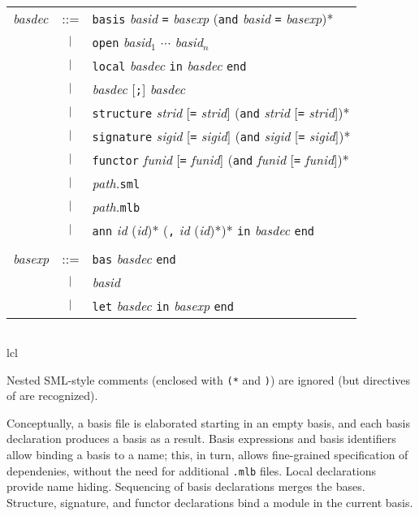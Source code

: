 \begin{latexonly}
\begin{center}
\begin{tabular}{lcl}
{\it basdec} 
& ::=    & {\tt basis} {\it basid} {\tt =} {\it basexp}
            ({\tt and} {\it basid} {\tt =} {\it basexp})* \\
& $\ |\ $ & {\tt open} {\it basid}$_1$ $\cdots$ {\it basid}$_n$ \\
& $\ |\ $ & {\tt local} {\it basdec} {\tt in} {\it basdec} {\tt end} \\
& $\ |\ $ & {\it basdec} [{\tt;}] {\it basdec} \\
& $\ |\ $ & {\tt structure} {\it strid} [{\tt =} {\it strid}] 
                ({\tt and} {\it strid} [{\tt =} {\it strid}])* \\
& $\ |\ $ & {\tt signature} {\it sigid} [{\tt =} {\it sigid}] 
                ({\tt and} {\it sigid} [{\tt =} {\it sigid}])* \\
& $\ |\ $ &   {\tt functor} {\it funid} [{\tt =} {\it funid}] 
                ({\tt and} {\it funid} [{\tt =} {\it funid}])* \\
& $\ |\ $ & {\it path.}{\tt sml} \\
& $\ |\ $ & {\it path.}{\tt mlb} \\
& $\ |\ $ & {\tt ann} {\it id} ({\it id})* ({\tt ,}  {\it id} ({\it id})*)*
           {\tt in} {\it basdec} {\tt end} \\
\\
{\it basexp}
& ::=    & {\tt bas} {\it basdec} {\tt end} \\
& $\ |\ $ & {\it basid} \\
& $\ |\ $ & {\tt let} {\it basdec} {\tt in} {\it basexp} {\tt end}
\end{tabular}
\end{center}
\end{latexonly}
\begin{htmlonly}
\begin{center}
\begin{tabular}{lcl}
\end{tabular}{lcl}
\end{center}
\end{htmlonly}

Nested SML-style comments (enclosed with {\tt (*} and {\tt *)}) are
ignored (but {\nline} directives of  are recognized).

Conceptually, a basis file is elaborated starting in an empty basis,
and each basis declaration produces a basis as a result.  Basis
expressions and basis identifiers allow binding a basis to a name;
this, in turn, allows fine-grained specification of dependenies,
without the need for additional {\tt .mlb} files.  Local declarations
provide name hiding.  Sequencing of basis declarations merges the
bases.  Structure, signature, and functor declarations bind a module
in the current basis.

